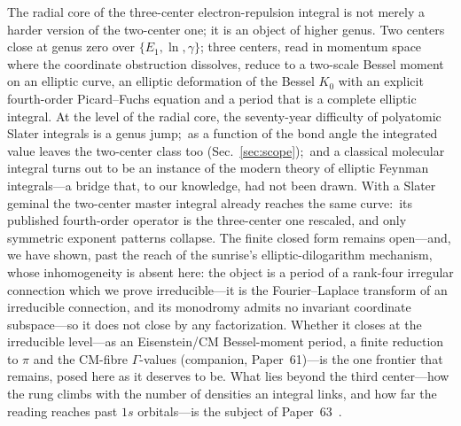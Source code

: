 \documentclass[aps,pra,twocolumn,superscriptaddress,longbibliography]{revtex4-2}
\begin{document}
The radial core of the three-center electron-repulsion integral is not merely a harder version
of the two-center one; it is an object of higher genus.  Two centers close at
genus zero over $\{E_{1},\ln,\gamma\}$; three centers, read in momentum space
where the coordinate obstruction dissolves, reduce to a two-scale Bessel
moment on an elliptic curve, an elliptic deformation of the Bessel $K_{0}$
with an explicit fourth-order Picard--Fuchs equation and a period that is a
complete elliptic integral.  At the level of the radial core, the seventy-year difficulty of
polyatomic Slater integrals is a genus jump;\ as a function of the bond angle the
integrated value leaves the two-center class too (Sec.~\ref{sec:scope});\ and a classical
molecular integral turns out to be an instance of the modern theory of
elliptic Feynman integrals---a bridge that, to our knowledge, had not been
drawn.  With a Slater geminal the two-center master integral already reaches the same
curve:\ its published fourth-order operator is the three-center one rescaled, and only
symmetric exponent patterns collapse.  The finite closed form remains open---and, we have shown, past the
reach of the sunrise's elliptic-dilogarithm mechanism, whose inhomogeneity is
absent here: the object is a period of a rank-four irregular connection which we
prove irreducible---it is the Fourier--Laplace transform of an irreducible
connection, and its monodromy admits no invariant coordinate subspace---so it does not
close by any factorization.  Whether it closes at the irreducible level---as an Eisenstein/CM Bessel-moment
period, a finite reduction to $\pi$ and the CM-fibre $\Gamma$-values
(companion, Paper~61)---is the one frontier that remains, posed here as
it deserves to be.  What lies beyond the third center---how the rung climbs with the number of
densities an integral links, and how far the reading reaches past $1s$
orbitals---is the subject of Paper~63~\cite{loutey_paper63}.
\end{document}
